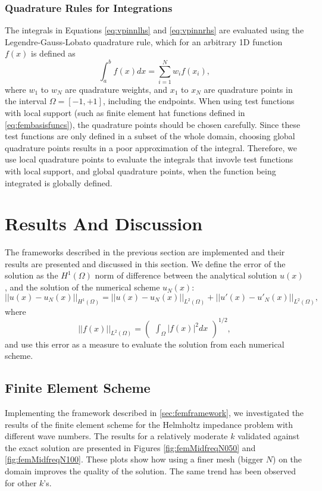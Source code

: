 \subsubsection{Quadrature Rules for Integrations}\label{sec:quadraturerules}
The integrals in Equations \ref{eq:vpinnlhs} and \ref{eq:vpinnrhs} are evaluated using the Legendre-Gauss-Lobato quadrature rule, which for an arbitrary 1D function $f(x)$ is defined as
\begin{equation}
    \label{eq:quadrature}
    \int_a^bf(x)dx = \sum_{i=1}^N{w_if(x_i)},
\end{equation}
where $w_1$ to $w_N$ are quadrature weights, and $x_1$ to $x_N$ are quadrature points in the interval $\Omega = [-1, +1]$, including the endpoints. When using test functions with local support (such as finite element hat functions defined in \autoref{eq:fembasisfuncs}), the quadrature points should be chosen carefully. Since these test functions are only defined in a subset of the whole domain, choosing global quadrature points results in a poor approximation of the integral. Therefore, we use local quadrature points to evaluate the integrals that invovle test functions with local support, and global quadrature points, when the function being integrated is globally defined.

\section{Results And Discussion}\label{sec:results}
The frameworks described in the previous section are implemented and their results are presented and discussed in this section. We define the error of the solution as the $H^1{(\Omega)}$ norm of difference between the analytical solution $u(x)$, and the solution of the numerical scheme $u_N(x)$:
\begin{equation}
    \label{eq:H1error}
    ||u(x) - u_N(x)||_{H^1{(\Omega)}} = ||u(x) - u_N(x)||_{L^2{(\Omega)}} + ||u'(x) - u'_N(x)||_{L^2{(\Omega)}},
\end{equation}
where
\begin{equation}
    \label{eq:L2error}
    ||f(x)||_{L^2{(\Omega)}} = \begin{pmatrix} \int_{\Omega}{|f(x)|^2dx} \end{pmatrix}^{1/2},
\end{equation}
and use this error as a measure to evaluate the solution from each numerical scheme.

\subsection{Finite Element Scheme}\label{sec:femresults}
Implementing the framework described in \autoref{sec:femframework}, we investigated the results of the finite element scheme for the Helmholtz impedance problem with different wave numbers. The results for a relatively moderate $k$ validated against the exact solution are presented in Figures \ref{fig:femMidfreqN050} and \ref{fig:femMidfreqN100}. These plots show how using a finer mesh (bigger $N$) on the domain improves the quality of the solution. The same trend has been observed for other $k$'s.

